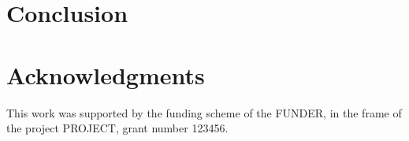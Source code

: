 \section{Conclusion}\label{sec:conclusion}

\lipsum[10-10]

\section*{Acknowledgments} This work was supported by the funding scheme of the
FUNDER, in the frame of the project PROJECT, grant number 123456.
